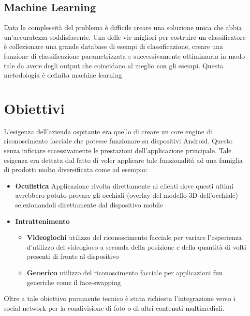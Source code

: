 \subsection{Machine Learning}

Data la complessità del problema è difficile creare una soluzione unica che abbia un'accuratezza soddisfacente. Una delle vie migliori per costruire un classificatore è collezionare una grande database di esempi di classificazione, creare una funzione di classificazione parametrizzata e successivamente ottimizzarla in modo tale da avere degli output che coincidano al meglio con gli esempi. Questa metodologia è definita machine learning


\section{Obiettivi}

L'esigenza dell'azienda ospitante era quello di creare un core engine di riconoscimento facciale che potesse funzionare su dispositivi Android. Questo senza inficiare eccessivamente le prestazioni dell'applicazione principale. Tale esigenza era dettata dal fatto di voler applicare tale funzionalità ad una famiglia di prodotti molto diversificata come ad esempio:

\begin{itemize}
\item \textbf{Oculistica} Applicazione rivolta direttamente ai clienti dove questi ultimi avrebbero potuto provare gli occhiali (overlay del modello 3D dell'occhiale) selezionandoli direttamente dal dispositivo mobile
\item \textbf{Intrattenimento}
\begin{itemize}
\item \textbf{Videogiochi} 
utilizzo del riconoscimento facciale per variare l'esperienza d'utilizzo del videogioco a seconda della posizione e della quantità di volti presenti di fronte al dispositivo
\item \textbf{Generico}
utilizzo del riconoscimento facciale per applicazioni fun generiche come il face-swapping 
\end{itemize}
\end{itemize}  

Oltre a tale obiettivo puramente tecnico è stata richiesta l'integrazione verso i social network per la condivisione di foto o di altri contenuti multimediali.

